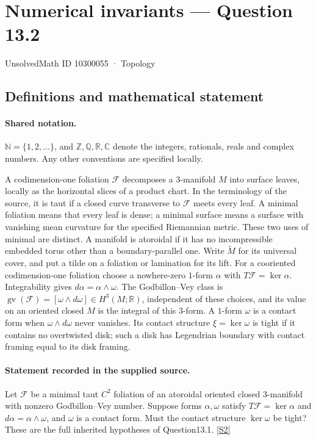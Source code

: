 \documentclass[11pt]{article}
\newcommand{\sref}[2]{\hyperlink{source:#1:#2}{[S#2]}}
\begin{document}
\setcounter{section}{10300054}
\section{Numerical invariants — Question 13.2}\label{10300055}
{\small\sffamily UnsolvedMath ID 10300055 · Topology}
\subsection{Definitions and mathematical statement}

\paragraph{Shared notation.}$\mathbb N=\{1,2,\ldots\}$, and $\mathbb Z,\mathbb Q,\mathbb R,\mathbb C$ denote the integers, rationals, reals and complex numbers. Any other conventions are specified locally.


A codimension-one foliation $\mathcal F$ decomposes a $3$-manifold $M$ into surface leaves, locally as the horizontal slices of a product chart. In the terminology of the source, it is taut if a closed curve transverse to $\mathcal F$ meets every leaf. A minimal foliation means that every leaf is dense; a minimal surface means a surface with vanishing mean curvature for the specified Riemannian metric. These two uses of minimal are distinct. A manifold is atoroidal if it has no incompressible embedded torus other than a boundary-parallel one. Write $\widetilde M$ for its universal cover, and put a tilde on a foliation or lamination for its lift. For a cooriented codimension-one foliation choose a nowhere-zero $1$-form $\alpha$ with $T\mathcal F=\ker\alpha$. Integrability gives $d\alpha=\alpha\wedge\omega$. The Godbillon--Vey class is $\operatorname{gv}(\mathcal F)=[\omega\wedge d\omega]\in H^3(M;\mathbb R)$, independent of these choices, and its value on an oriented closed $M$ is the integral of this $3$-form. A $1$-form $\omega$ is a contact form when $\omega\wedge d\omega$ never vanishes. Its contact structure $\xi=\ker\omega$ is tight if it contains no overtwisted disk; such a disk has Legendrian boundary with contact framing equal to its disk framing.
\paragraph{Statement recorded in the supplied source.}
Let $\mathcal F$ be a minimal taut $C^2$ foliation of an atoroidal oriented closed $3$-manifold with nonzero Godbillon--Vey number. Suppose forms $\alpha,\omega$ satisfy $T\mathcal F=\ker\alpha$ and $d\alpha=\alpha\wedge\omega$, and $\omega$ is a contact form. Must the contact structure $\ker\omega$ be tight? These are the full inherited hypotheses of Question13.1. \sref{10300055}{2}
\end{document}
